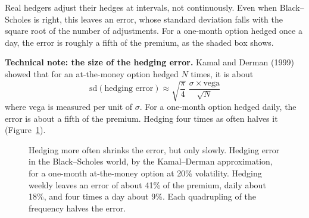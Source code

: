 Real hedgers adjust their hedges at intervals, not continuously. Even when Black--Scholes is right, this leaves an error, whose standard deviation falls with the square root of the number of adjustments. For a one-month option hedged once a day, the error is roughly a fifth of the premium, as the shaded box shows.

\begin{technote}
\textbf{Technical note: the size of the hedging error.} Kamal and Derman (1999) showed that for an at-the-money option hedged $N$ times, it is about
\begin{equation}
  \mathrm{sd}(\text{hedging error}) \approx \sqrt{\frac{\pi}{4}}\;\frac{\sigma \times \text{vega}}{\sqrt{N}}
  \label{eq:14-kd}
\end{equation}
where vega is measured per unit of $\sigma$. For a one-month option hedged daily, the error is about a fifth of the premium. Hedging four times as often halves it (Figure~\ref{fig:14-freq}).
\end{technote}

\begin{figure}[htbp]
\centering
{}
\caption{Hedging more often shrinks the error, but only slowly. Hedging error in the Black--Scholes world, by the Kamal--Derman approximation, for a one-month at-the-money option at 20\% volatility. Hedging weekly leaves an error of about 41\% of the premium, daily about 18\%, and four times a day about 9\%. Each quadrupling of the frequency halves the error.}
\label{fig:14-freq}
\end{figure}

